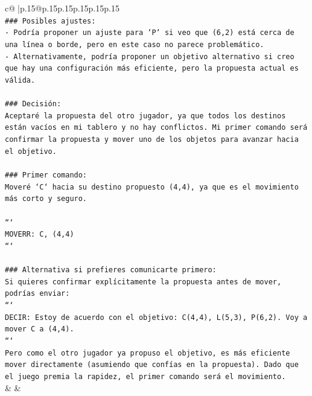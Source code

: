 \documentclass{article}
\begin{document}
{\begin{supertabular}{c@{$\;$}|p{.15\linewidth}@{}p{.15\linewidth}p{.15\linewidth}p{.15\linewidth}p{.15\linewidth}p{.15\linewidth}}
{{{\\ 
\texttt{\#\#\# Posibles ajustes:} \\
\texttt{{-} Podría proponer un ajuste para `P` si veo que (6,2) está cerca de una línea o borde, pero en este caso no parece problemático.} \\
\texttt{{-} Alternativamente, podría proponer un objetivo alternativo si creo que hay una configuración más eficiente, pero la propuesta actual es válida.} \\
\\ 
\texttt{\#\#\# Decisión:} \\
\texttt{Aceptaré la propuesta del otro jugador, ya que todos los destinos están vacíos en mi tablero y no hay conflictos. Mi primer comando será confirmar la propuesta y mover uno de los objetos para avanzar hacia el objetivo.} \\
\\ 
\texttt{\#\#\# Primer comando:} \\
\texttt{Moveré `C` hacia su destino propuesto (4,4), ya que es el movimiento más corto y seguro.} \\
\\ 
\texttt{```} \\
\texttt{MOVERR: C, (4,4)} \\
\texttt{```} \\
\\ 
\texttt{\#\#\# Alternativa si prefieres comunicarte primero:} \\
\texttt{Si quieres confirmar explícitamente la propuesta antes de mover, podrías enviar:} \\
\texttt{```} \\
\texttt{DECIR: Estoy de acuerdo con el objetivo: C(4,4), L(5,3), P(6,2). Voy a mover C a (4,4).} \\
\texttt{```} \\
\texttt{Pero como el otro jugador ya propuso el objetivo, es más eficiente mover directamente (asumiendo que confías en la propuesta). Dado que el juego premia la rapidez, el primer comando será el movimiento.} \\
            }
        }
    }
    & & \\ \\


\end{supertabular}}
\end{document}
